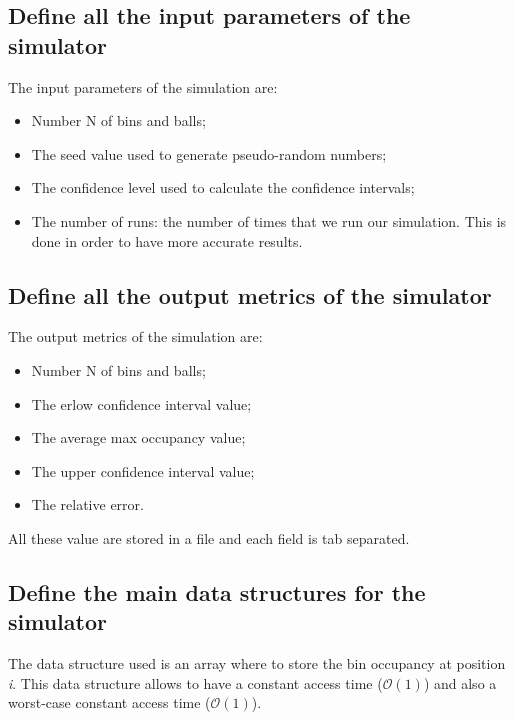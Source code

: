 \documentclass{report}
\begin{document}
		\subsection{Define all the input parameters of the simulator}
			The input parameters of the simulation are:
			\begin{itemize}
				\item Number N of bins and balls;
				\item The seed value used to generate pseudo-random numbers;
				\item The confidence level used to calculate the confidence intervals;
				\item The number of runs: the number of times that we run our simulation. This is done in order to have more accurate results.
			\end{itemize}
			 
	\subsection{Define all the output metrics of the simulator}
			The output metrics of the simulation are:
			\begin{itemize}
				\item Number N of bins and balls;
				\item The erlow confidence interval value;
				\item The average max occupancy value;
				\item The upper confidence interval value;
				\item The relative error.
			\end{itemize}
			All these value are stored in a file and each field is tab separated.
	
	\subsection{Define the main data structures for the simulator}
			The data structure used is an array where to store the bin occupancy at position \emph{i}. This data structure allows to have a constant access time ($\mathcal{O}(1)$) and also a worst-case constant access time ($\mathcal{O}(1)$).
			
\end{document}
